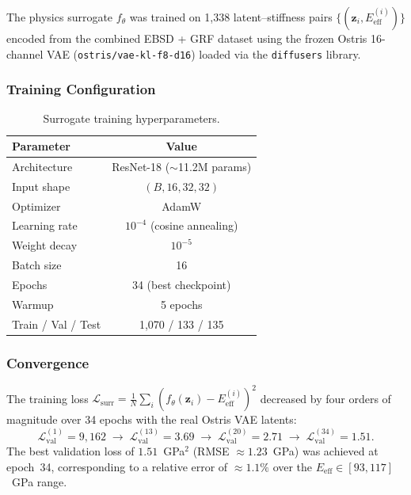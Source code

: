 \documentclass[12pt,a4paper]{article}
\newcommand{\loss}{\mathcal{L}}
\newcommand{\Eeff}{E_{\mathrm{eff}}}
\newcommand{\zvec}{\bm{z}}
\theoremstyle{definition}
\begin{document}
The physics surrogate $f_\theta$ was trained on 1{,}338 latent--stiffness
pairs $\{(\zvec_i, \Eeff^{(i)})\}$ encoded from the combined EBSD + GRF
dataset using the frozen Ostris 16-channel VAE (\texttt{ostris/vae-kl-f8-d16})
loaded via the \texttt{diffusers} library.

\subsubsection{Training Configuration}

\begin{table}[h]
  \centering
  \caption{Surrogate training hyperparameters.}
  \label{tab:surrogate_training}
  \begin{tabular}{lc}
    \toprule
    Parameter & Value \\
    \midrule
    Architecture & ResNet-18 ($\sim$11.2M params) \\
    Input shape & $(B, 16, 32, 32)$ \\
    Optimizer & AdamW \\
    Learning rate & $10^{-4}$ (cosine annealing) \\
    Weight decay & $10^{-5}$ \\
    Batch size & 16 \\
    Epochs & 34 (best checkpoint) \\
    Warmup & 5 epochs \\
    Train / Val / Test & 1{,}070 / 133 / 135 \\
    \bottomrule
  \end{tabular}
\end{table}

\subsubsection{Convergence}

The training loss $\loss_{\mathrm{surr}} = \frac{1}{N}\sum_i (f_\theta(\zvec_i) - \Eeff^{(i)})^2$
decreased by four orders of magnitude over 34 epochs with the real
Ostris VAE latents:
\begin{equation}
  \loss_{\mathrm{val}}^{(1)} = 9{,}162 \;\to\; \loss_{\mathrm{val}}^{(13)} = 3.69
  \;\to\; \loss_{\mathrm{val}}^{(20)} = 2.71
  \;\to\; \loss_{\mathrm{val}}^{(34)} = 1.51.
  \label{eq:surrogate_convergence}
\end{equation}
The best validation loss of $1.51$~GPa$^2$ (RMSE $\approx 1.23$~GPa)
was achieved at epoch~34, corresponding to a relative error of
$\approx 1.1\%$ over the $\Eeff \in [93, 117]$~GPa range.
\end{document}
